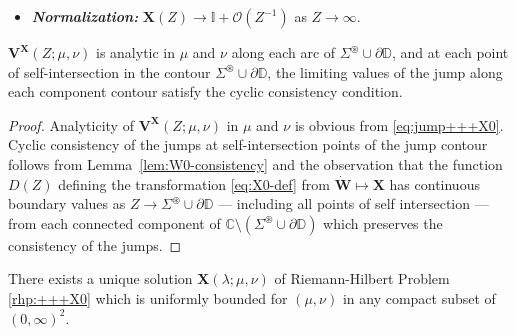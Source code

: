 \documentclass[12pt]{amsart}
\numberwithin{equation}{section}
\newcommand{\ee}{\mathrm{e}}
\newcommand{\ii}{\mathrm{i}}
\newcommand{\SP}{\lambda}
\newcommand{\C}{\mathbb{C}}
\newcommand{\bigo}[1]{ \mathcal{O}\! \left( #1 \right) }
\DeclareMathOperator{\sgn}{sgn}
\renewcommand{\Re}{\operatorname{Re}}
\begin{document}
\begin{myrhp}
\begin{itemize}
\begin{equation}
\begin{dcases}
	 & \arg(Z) = \frac{5\pi}{6}, \\ 
	 \ee^{\ii (1-\sqrt{2}) \zeta(-\frac{1}{2}) \sgn( \Re \{ Z \} ) Z^{-1} \sigma_3}, & Z \in \partial \mathbb{D}^+, \\
	 \quad \mathbf{V^X}(Z^*;\mu,\nu)^\dagger, & \arg(Z) \in -\frac{k\pi}{6},\  k=1,\dots,5.
\end{dcases}
\label{eq:jump+++X0}
\end{equation}
\item[]\textit{\textbf{Normalization:}} $\mathbf{X}(Z)\to\mathbb{I} + \bigo{Z^{-1}}$ as $Z\to\infty$.
\end{itemize}
\label{rhp:+++X0}
\end{myrhp}

\begin{lem}
	$\mathbf{V^X}(Z;\mu,\nu)$ is analytic in $\mu$ and $\nu$ along each arc of $\Sigma^\circledast \cup \partial \mathbb{D}$, and at each point of self-intersection in the contour $\Sigma^\circledast \cup \partial \mathbb{D}$, the limiting values of the jump along each component contour satisfy the cyclic consistency condition. 
\label{lem:X0-consistency}	
\end{lem}

\begin{proof}	
	Analyticity of $\mathbf{V^X}(Z;\mu,\nu)$ in $\mu$ and $\nu$ is obvious from \eqref{eq:jump+++X0}. Cyclic consistency of the jumps at self-intersection points of the jump contour follows from Lemma~\ref{lem:W0-consistency} and the observation that the function $D(Z)$ defining the transformation \eqref{eq:X0-def} from $\dot{\mathbf{W}} \mapsto \mathbf{X}$ has continuous boundary values as $Z \to \Sigma^\circledast \cup \partial \mathbb{D}$ --- including all points of self intersection --- from each connected component of $\C \setminus (\Sigma^\circledast \cup \partial \mathbb{D})$ which preserves the consistency of the jumps.	
\end{proof}	

\begin{lem}
There exists a unique solution $\mathbf{X}(\SP;\mu,\nu)$ of Riemann-Hilbert Problem \ref{rhp:+++X0} which is uniformly bounded for $(\mu, \nu)$ in any compact subset of $(0,\infty)^2$. 
\end{lem}
\end{document}
